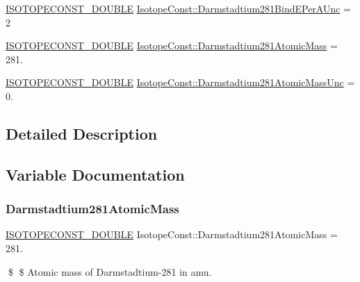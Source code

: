 \begin{DoxyCompactItemize}
\item 
\mbox{\hyperlink{group___isotope_const-_macros_ga8f45a7272ce02c0b4c65c44636ed719a}{I\+S\+O\+T\+O\+P\+E\+C\+O\+N\+S\+T\+\_\+\+D\+O\+U\+B\+LE}} \mbox{\hyperlink{group___isotope_const-_darmstadtium-_ds281_ga7526f07544d2e3ec93b97280b220dbff}{Isotope\+Const\+::\+Darmstadtium281\+Bind\+E\+Per\+A\+Unc}} = 2
\item 
\mbox{\hyperlink{group___isotope_const-_macros_ga8f45a7272ce02c0b4c65c44636ed719a}{I\+S\+O\+T\+O\+P\+E\+C\+O\+N\+S\+T\+\_\+\+D\+O\+U\+B\+LE}} \mbox{\hyperlink{group___isotope_const-_darmstadtium-_ds281_ga2b97fb4f1dd56d42fd671e6f12a8f46d}{Isotope\+Const\+::\+Darmstadtium281\+Atomic\+Mass}} = 281.
\item 
\mbox{\hyperlink{group___isotope_const-_macros_ga8f45a7272ce02c0b4c65c44636ed719a}{I\+S\+O\+T\+O\+P\+E\+C\+O\+N\+S\+T\+\_\+\+D\+O\+U\+B\+LE}} \mbox{\hyperlink{group___isotope_const-_darmstadtium-_ds281_ga9a85dcba2eafb733366ff2b69c44c25e}{Isotope\+Const\+::\+Darmstadtium281\+Atomic\+Mass\+Unc}} = 0.
\end{DoxyCompactItemize}


\subsection{Detailed Description}


\subsection{Variable Documentation}
\mbox{\label{group___isotope_const-_darmstadtium-_ds281_ga2b97fb4f1dd56d42fd671e6f12a8f46d}} 
\subsubsection{\texorpdfstring{Darmstadtium281\+Atomic\+Mass}{Darmstadtium281AtomicMass}}
{\footnotesize\ttfamily \mbox{\hyperlink{group___isotope_const-_macros_ga8f45a7272ce02c0b4c65c44636ed719a}{I\+S\+O\+T\+O\+P\+E\+C\+O\+N\+S\+T\+\_\+\+D\+O\+U\+B\+LE}} Isotope\+Const\+::\+Darmstadtium281\+Atomic\+Mass = 281.}

\$ \$ Atomic mass of Darmstadtium-\/281 in amu. \mbox{\label{group___isotope_const-_darmstadtium-_ds281_ga9a85dcba2eafb733366ff2b69c44c25e}} 
